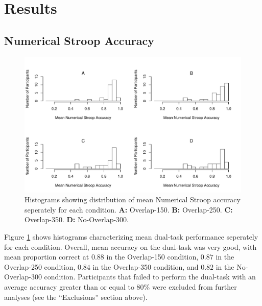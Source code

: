 \documentclass[apacite,draftfirst,jou]{apa6}
\begin{document}
\section*{Results}
\subsection*{Numerical Stroop Accuracy}
\begin{figure}[t]
\centering \includegraphics[width=1.0\textwidth]{../figures/fig_exc_dual.pdf}
\caption{ Histograms showing distribution of mean Numerical Stroop accuracy
  seperately for each condition. \textbf{A:} Overlap-150. \textbf{B:} Overlap-250.
  \textbf{C:} Overlap-350. \textbf{D:} No-Overlap-300. }
    \label{fig:exc_dual}
\end{figure}

Figure \ref{fig:exc_dual} shows histograms characterizing mean dual-task
performance seperately for each condition. Overall, mean accuracy on the
dual-task was very good, with mean proportion correct at $0.88$ in the
Overlap-150 condition, $0.87$ in the Overlap-250 condition, $0.84$ in the
Overlap-350 condition, and $0.82$ in the No-Overlap-300 condition. Participants
that failed to perform the dual-task with an average accuracy greater than or
equal to 80\% were excluded from further analyses (see the ``Exclusions''
section above).
\end{document}
